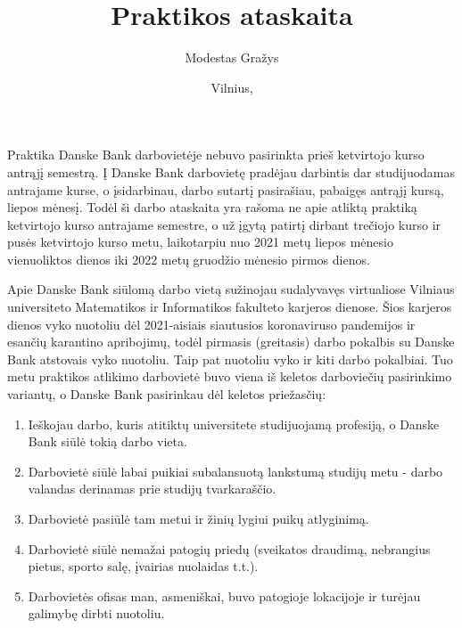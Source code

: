 \documentclass{VUMIFPSBakPrakAt}
\title{Praktikos ataskaita}
\author{Modestas Gražys}
\date{Vilnius, \the\year}
\begin{document}
\maketitle

\tableofcontents

\begin{comment}
Įvadas. Išdėstomi praktikos vietos pasirinkimo motyvai, praktikos užduotis, jos tikslas, spręstieji
uždaviniai, pateikiama praktinės veiklos planas praktikos atlikimo eiga (2--3 psl.).
\\
\end{comment}
\par
Praktika Danske Bank darbovietėje nebuvo pasirinkta prieš ketvirtojo kurso antrąjį semestrą. Į Danske Bank darbovietę pradėjau darbintis dar studijuodamas antrajame kurse, o įsidarbinau, darbo sutartį pasirašiau, pabaigęs antrąjį kursą, liepos mėnesį. Todėl ši darbo ataskaita yra rašoma ne apie atliktą praktiką ketvirtojo kurso antrajame semestre, o už įgytą patirtį dirbant trečiojo kurso ir pusės ketvirtojo kurso metu, laikotarpiu nuo 2021 metų liepos mėnesio vienuoliktos dienos iki 2022 metų gruodžio mėnesio pirmos dienos.
\par
Apie Danske Bank siūlomą darbo vietą sužinojau sudalyvavęs virtualiose Vilniaus universiteto Matematikos ir Informatikos fakulteto karjeros dienose. Šios karjeros dienos vyko nuotoliu dėl 2021-aisiais siautusios koronaviruso pandemijos ir esančių karantino apribojimų, todėl pirmasis (greitasis) darbo pokalbis su Danske Bank atstovais vyko nuotoliu. Taip pat nuotoliu vyko ir kiti darbo pokalbiai. Tuo metu praktikos atlikimo darbovietė buvo viena iš keletos darboviečių pasirinkimo variantų, o Danske Bank pasirinkau dėl keletos priežasčių:
\vspace{10pt}
\begin{enumerate}
    \item Ieškojau darbo, kuris atitiktų universitete studijuojamą profesiją, o Danske Bank siūlė tokią darbo vieta.
    \item Darbovietė siūlė labai puikiai subalansuotą lankstumą studijų metu - darbo valandas derinamas prie studijų tvarkaraščio.
    \item Darbovietė pasiūlė tam metui ir žinių lygiui puikų atlyginimą.
    \item Darbovietė siūlė nemažai patogių priedų (sveikatos draudimą, nebrangius pietus, sporto salę, įvairias nuolaidas t.t.).
    \item Darbovietės ofisas man, asmeniškai, buvo patogioje lokacijoje ir turėjau galimybę dirbti nuotoliu.
\end{enumerate}
\end{document}
